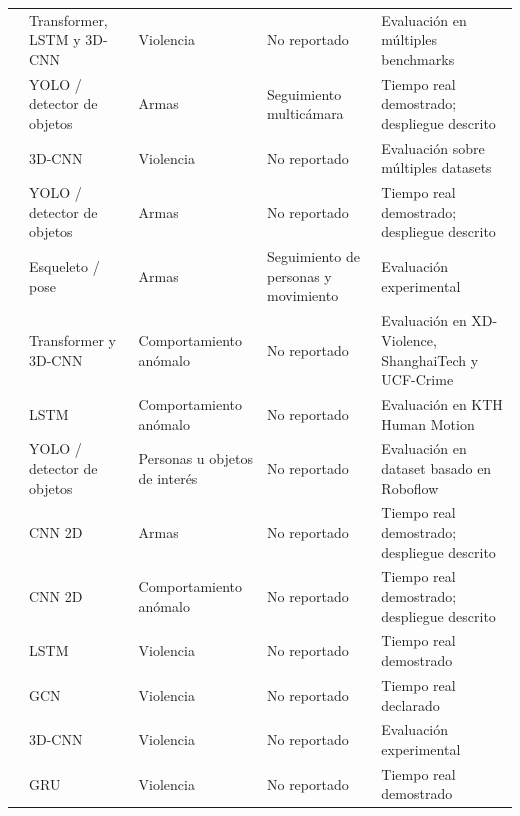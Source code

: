 \documentclass[pdflatex,sn-mathphys-num]{sn-jnl}%
\theoremstyle{thmstyleone}%
\theoremstyle{thmstyletwo}%
\theoremstyle{thmstylethree}%
\begin{document}
\begin{longtable}{@{}L{2.0cm}L{2.5cm}L{2.55cm}L{2.4cm}L{2.9cm}@{}}
\citet{ciampi2022} &
Transformer, LSTM y 3D-CNN &
Violencia &
No reportado &
Evaluación en múltiples benchmarks \\

\citet{fierrosilva2026} &
YOLO / detector de objetos &
Armas &
Seguimiento multicámara &
Tiempo real demostrado; despliegue descrito \\

\citet{huszar2023} &
3D-CNN &
Violencia &
No reportado &
Evaluación sobre múltiples datasets \\

\citet{fathy2022} &
YOLO / detector de objetos &
Armas &
No reportado &
Tiempo real demostrado; despliegue descrito \\

\citet{muriithi2024} &
Esqueleto / pose &
Armas &
Seguimiento de personas y movimiento &
Evaluación experimental \\

\citet{shin2025} &
Transformer y 3D-CNN &
Comportamiento anómalo &
No reportado &
Evaluación en XD-Violence, ShanghaiTech y UCF-Crime \\

\citet{pangavhane2025} &
LSTM &
Comportamiento anómalo &
No reportado &
Evaluación en KTH Human Motion \\

\citet{dalal2024} &
YOLO / detector de objetos &
Personas u objetos de interés &
No reportado &
Evaluación en dataset basado en Roboflow \\

\citet{ingle2022} &
CNN 2D &
Armas &
No reportado &
Tiempo real demostrado; despliegue descrito \\

\citet{saleem2022} &
CNN 2D &
Comportamiento anómalo &
No reportado &
Tiempo real demostrado; despliegue descrito \\

\citet{azzakhnini2025} &
LSTM &
Violencia &
No reportado &
Tiempo real demostrado \\

\citet{g2025} &
GCN &
Violencia &
No reportado &
Tiempo real declarado \\

\citet{sernani2021} &
3D-CNN &
Violencia &
No reportado &
Evaluación experimental \\

\citet{salman2026} &
GRU &
Violencia &
No reportado &
Tiempo real demostrado \\


\end{longtable}
\end{document}
